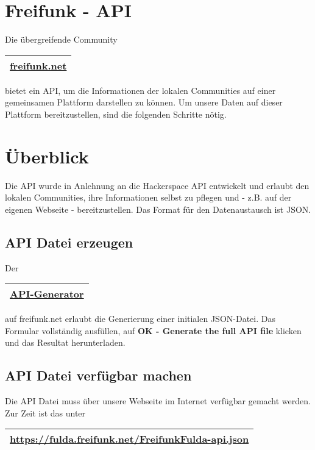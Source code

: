 \section{Freifunk - API}

Die übergreifende Community
%
\begin{tabular}{c}
\arrayrulecolor{FFmagenta} \hline
\href{http://freifunk.net/}{freifunk.net} \\
\hline
\end{tabular}
%
bietet ein API, um die Informationen der lokalen Communities auf einer gemeinsamen Plattform darstellen zu können. Um unsere Daten auf dieser Plattform bereitzustellen, sind die folgenden Schritte nötig.
\section{Überblick}

Die API wurde in Anlehnung an die Hackerspace API entwickelt und erlaubt den lokalen Communities, ihre Informationen selbst zu pflegen und - z.B. auf der eigenen Webseite - bereitzustellen. Das Format für den Datenaustausch ist JSON.

\subsection{API Datei erzeugen}

Der%
\begin{tabular}{c}
\arrayrulecolor{FFmagenta} \hline
\href{http://freifunk.net/api-generator/}{API-Generator} \\
\hline
\end{tabular}
%
auf freifunk.net erlaubt die Generierung einer initialen JSON-Datei. Das Formular vollständig ausfüllen, auf \textbf{OK - Generate the full API file} klicken und das Resultat herunterladen.

\subsection{API Datei verfügbar machen}

Die API Datei muss über unsere Webseite im Internet verfügbar gemacht werden. Zur Zeit ist das unter%
\begin{tabular}{c}
\arrayrulecolor{FFmagenta} \hline
\href{https://fulda.freifunk.net/FreifunkFulda-api.json}{https://fulda.freifunk.net/FreifunkFulda-api.json} \\
\hline
\end{tabular}
%

